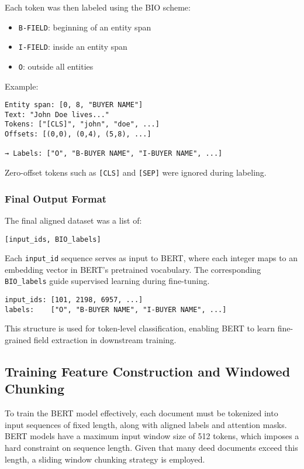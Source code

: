 \documentclass{article}
\begin{document}
Each token was then labeled using the BIO scheme:
\begin{itemize}
    \item \texttt{B-FIELD}: beginning of an entity span
    \item \texttt{I-FIELD}: inside an entity span
    \item \texttt{O}: outside all entities
\end{itemize}

Example:
\begin{verbatim}
Entity span: [0, 8, "BUYER NAME"]
Text: "John Doe lives..."
Tokens: ["[CLS]", "john", "doe", ...]
Offsets: [(0,0), (0,4), (5,8), ...]

→ Labels: ["O", "B-BUYER NAME", "I-BUYER NAME", ...]
\end{verbatim}

Zero-offset tokens such as \texttt{[CLS]} and \texttt{[SEP]} were ignored during labeling.

\subsubsection{Final Output Format}

The final aligned dataset was a list of:
\begin{verbatim}
[input_ids, BIO_labels]
\end{verbatim}

Each \texttt{input\_id} sequence serves as input to BERT, where each integer maps to an embedding vector in BERT’s pretrained vocabulary. The corresponding \texttt{BIO\_labels} guide supervised learning during fine-tuning.

\begin{verbatim}
input_ids: [101, 2198, 6957, ...]
labels:    ["O", "B-BUYER NAME", "I-BUYER NAME", ...]
\end{verbatim}

This structure is used for token-level classification, enabling BERT to learn fine-grained field extraction in downstream training.

\subsection{Training Feature Construction and Windowed Chunking}

To train the BERT model effectively, each document must be tokenized into input sequences of fixed length, along with aligned labels and attention masks. BERT models have a maximum input window size of 512 tokens, which imposes a hard constraint on sequence length. Given that many deed documents exceed this length, a sliding window chunking strategy is employed.
\end{document}
